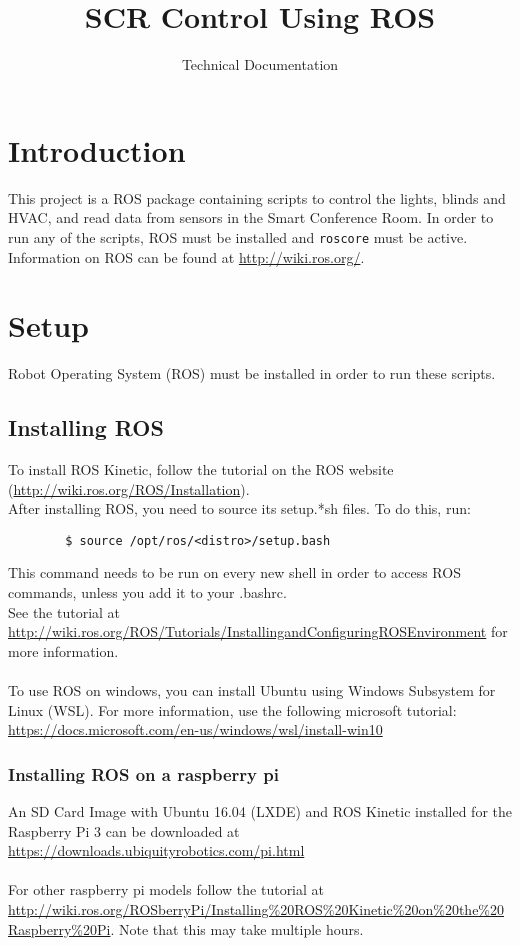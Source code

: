 \documentclass[twoside]{article}
\title{SCR Control Using ROS}
\author{Technical Documentation}
\date{ }
\begin{document}
	\maketitle
	
	\tableofcontents
	\newpage
	
	\section{Introduction}
	This project is a ROS package containing scripts to control the lights, blinds and HVAC, and read data from sensors in the Smart Conference Room. In order to run any of the scripts, ROS must be installed and \verb|roscore| must be active. Information on ROS can be found at \url{http://wiki.ros.org/}.
	

	
	\section{Setup}
	
	
	Robot Operating System (ROS) must be installed in order to run these scripts.
	
	\subsection{Installing ROS}
	To install ROS Kinetic, follow the tutorial on the ROS website (\url{http://wiki.ros.org/ROS/Installation}).\\
	After installing ROS, you need to source its setup.*sh files. To do this, run:
	
	\begin{verbatim}
	    $ source /opt/ros/<distro>/setup.bash
	\end{verbatim} 
	This command needs to be run on every new shell in order to access ROS commands, unless you add it to your .bashrc.\\
	See the tutorial at \url{http://wiki.ros.org/ROS/Tutorials/InstallingandConfiguringROSEnvironment} for more information. \\  \\
	To use ROS on windows, you can install Ubuntu using Windows Subsystem for Linux (WSL). For more information, use the following microsoft tutorial: \url{https://docs.microsoft.com/en-us/windows/wsl/install-win10}
	
	\subsubsection{Installing ROS on a raspberry pi}
	An SD Card Image with Ubuntu 16.04 (LXDE) and ROS Kinetic installed for the Raspberry Pi 3 can be downloaded at \url{https://downloads.ubiquityrobotics.com/pi.html}\\ \\
	For other raspberry pi models follow the tutorial at \url{http://wiki.ros.org/ROSberryPi/Installing%20ROS%20Kinetic%20on%20the%20Raspberry%20Pi}. Note that this may take multiple hours.
	
\end{document}
